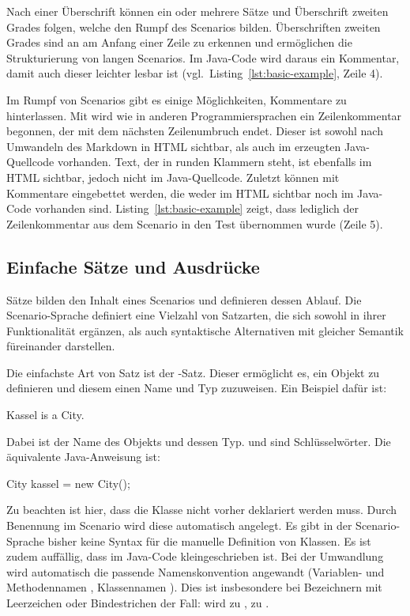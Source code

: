Nach einer Überschrift können ein oder mehrere Sätze und Überschrift zweiten Grades folgen, welche den Rumpf des Scenarios bilden.
Überschriften zweiten Grades sind an \mdcode{##} am Anfang einer Zeile zu erkennen und ermöglichen die Strukturierung von langen Scenarios.
Im Java-Code wird daraus ein Kommentar, damit auch dieser leichter lesbar ist (vgl.\ Listing~\ref{lst:basic-example}, Zeile 4).

Im Rumpf von Scenarios gibt es einige Möglichkeiten, Kommentare zu hinterlassen.
Mit \jcode{//} wird wie in anderen Programmiersprachen ein Zeilenkommentar begonnen,
der mit dem nächsten Zeilenumbruch endet.
Dieser ist sowohl nach Umwandeln des Markdown in HTML sichtbar,
als auch im erzeugten Java-Quellcode vorhanden.
Text, der in runden Klammern  steht, ist ebenfalls im HTML sichtbar,
jedoch nicht im Java-Quellcode.
Zuletzt können mit  Kommentare eingebettet werden,
die weder im HTML sichtbar noch im Java-Code vorhanden sind.
Listing~\ref{lst:basic-example} zeigt, dass lediglich der Zeilenkommentar aus dem Scenario in den Test übernommen wurde (Zeile 5).

\subsection{Einfache Sätze und Ausdrücke}\label{subsec:simple-sentences-and-expressions}

Sätze bilden den Inhalt eines Scenarios und definieren dessen Ablauf.
Die Scenario-Sprache definiert eine Vielzahl von Satzarten,
die sich sowohl in ihrer Funktionalität ergänzen,
als auch syntaktische Alternativen mit gleicher Semantik füreinander darstellen.

Die einfachste Art von Satz ist der -Satz.
Dieser ermöglicht es, ein Objekt zu definieren und diesem einen Name und Typ zuzuweisen.
Ein Beispiel dafür ist:

\begin{codeblock}
    Kassel is a City.
\end{codeblock}

Dabei ist  der Name des Objekts und  dessen Typ.
 und  sind Schlüsselwörter.
Die äquivalente Java-Anweisung ist:

\begin{jcodeblock}
    City kassel = new City();
\end{jcodeblock}

Zu beachten ist hier, dass die Klasse  nicht vorher deklariert werden muss.
Durch Benennung im Scenario wird diese automatisch angelegt.
Es gibt in der Scenario-Sprache bisher keine Syntax für die manuelle Definition von Klassen.
Es ist zudem auffällig, dass  im Java-Code kleingeschrieben ist.
Bei der Umwandlung wird automatisch die passende Namenskonvention angewandt (Variablen- und Methodennamen , Klassennamen ).
Dies ist insbesondere bei Bezeichnern mit Leerzeichen oder Bindestrichen der Fall:
 wird zu ,  zu .

